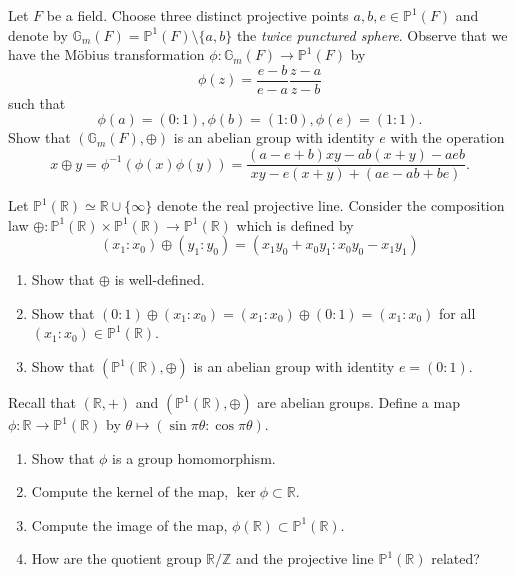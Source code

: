 \documentclass[12 pt, letterpaper]{hmcpset}
\begin{document}
\begin{problem}[Problem 1.]
	Let $F$ be a field. Choose three distinct projective points  $a, b, e \in \mathbb{P}^{1}(F)$ and denote by $\mathbb{G}_{m}(F) = \mathbb{P}^{1}(F) \setminus \{ a, b \}$ the \emph{twice punctured sphere}. Observe that we have the M\"{o}bius transformation $\phi : \mathbb{G}_{m}(F) \to \mathbb{P}^{1}(F)$ by
	\[
		\phi(z) = \frac{e - b}{e - a} \frac{z - a}{z - b}
	\]
	such that
	\[
		\phi(a) = (0 : 1), \phi(b) = (1 : 0), \phi(e) = (1 : 1).
	\]
	Show that $(\mathbb{G}_{m}(F), \oplus)$ is an abelian group with identity $e$ with the operation
	\[
		x \oplus y = \phi^{-1}(\phi(x) \phi(y)) = \frac{(a - e + b)xy - ab(x + y) - a e b}{xy - e(x + y) + (a e - a b + b e)}.
	\]
\end{problem}

\pagebreak

\begin{problem}[Problem 2.]
	Let $\mathbb{P}^{1}(\mathbb{R}) \simeq \mathbb{R} \cup \{ \infty \}$ denote the real projective line. Consider the composition law $\oplus : \mathbb{P}^{1}(\mathbb{R}) \times \mathbb{P}^{1}(\mathbb{R}) \to \mathbb{P}^{1}(\mathbb{R})$ which is defined by
	\[
		(x_{1} : x_{0}) \oplus (y_{1} : y_{0}) = (x_{1} y_{0} + x_{0} y_{1} : x_{0} y_{0} - x_{1} y_{1})
	\]
	\begin{enumerate}
		\item Show that $\oplus$ is well-defined.
		\item Show that $(0: 1) \oplus (x_{1} : x_{0}) = (x_{1} : x_{0}) \oplus (0 : 1) = (x_{1} : x_{0})$ for all $(x_{1} : x_{0}) \in \mathbb{P}^{1}(\mathbb{R})$.
		\item Show that $(\mathbb{P}^{1}(\mathbb{R}), \oplus)$ is an abelian group with identity $e = (0 : 1)$.
	\end{enumerate}
\end{problem}

\pagebreak

\begin{problem}[Problem 3.]
	Recall that $(\mathbb{R}, +)$ and $(\mathbb{P}^{1}(\mathbb{R}), \oplus)$ are abelian groups. Define a map $\phi : \mathbb{R} \to \mathbb{P}^{1}(\mathbb{R})$ by $\theta \mapsto (\sin{\pi \theta} : \cos{\pi \theta})$.
	\begin{enumerate}
		\item Show that $\phi$ is a group homomorphism.
		\item Compute the kernel of the map, $\ker \phi \subset \mathbb{R}$.
		\item Compute the image of the map,  $\phi(\mathbb{R}) \subset \mathbb{P}^{1}(\mathbb{R})$.
		\item How are the quotient group $\mathbb{R} / \mathbb{Z}$ and the projective line $\mathbb{P}^{1}(\mathbb{R})$ related?
	\end{enumerate}
\end{problem}
\end{document}
